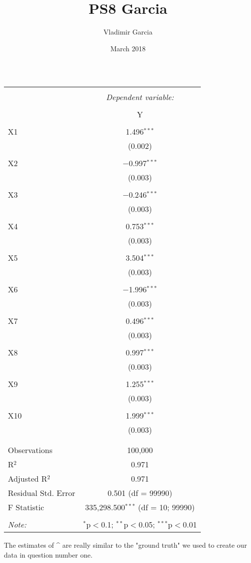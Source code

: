 \documentclass{article}
\title{PS8 Garcia}
\author{Vladimir Garcia}
\date{March 2018}
\begin{document}
\maketitle

\begin{table}[!htbp] 
\centering 
  \caption{} 
  \label{} 
\begin{tabular}{@{\extracolsep{5pt}}lc} 
\\[-1.8ex]\hline 
\hline \\[-1.8ex] 
 & \multicolumn{1}{c}{\textit{Dependent variable:}} \\ 
\cline{2-2} 
\\[-1.8ex] & Y \\ 
\hline \\[-1.8ex] 
 X1 & 1.496$^{***}$ \\ 
  & (0.002) \\ 
  & \\ 
 X2 & $-$0.997$^{***}$ \\ 
  & (0.003) \\ 
  & \\ 
 X3 & $-$0.246$^{***}$ \\ 
  & (0.003) \\ 
  & \\ 
 X4 & 0.753$^{***}$ \\ 
  & (0.003) \\ 
  & \\ 
 X5 & 3.504$^{***}$ \\ 
  & (0.003) \\ 
  & \\ 
 X6 & $-$1.996$^{***}$ \\ 
  & (0.003) \\ 
  & \\ 
 X7 & 0.496$^{***}$ \\ 
  & (0.003) \\ 
  & \\ 
 X8 & 0.997$^{***}$ \\ 
  & (0.003) \\ 
  & \\ 
 X9 & 1.255$^{***}$ \\ 
  & (0.003) \\ 
  & \\ 
 X10 & 1.999$^{***}$ \\ 
  & (0.003) \\ 
  & \\ 
\hline \\[-1.8ex] 
Observations & 100,000 \\ 
R$^{2}$ & 0.971 \\ 
Adjusted R$^{2}$ & 0.971 \\ 
Residual Std. Error & 0.501 (df = 99990) \\ 
F Statistic & 335,298.500$^{***}$ (df = 10; 99990) \\ 
\hline 
\hline \\[-1.8ex] 
\textit{Note:}  & \multicolumn{1}{r}{$^{*}$p$<$0.1; $^{**}$p$<$0.05; $^{***}$p$<$0.01} \\ 
\end{tabular} 
\end{table} 

The estimates of \^{\textbeta} are really similar to the "ground truth" {\textbeta} we used to create our data in question number one. 
\end{document}
